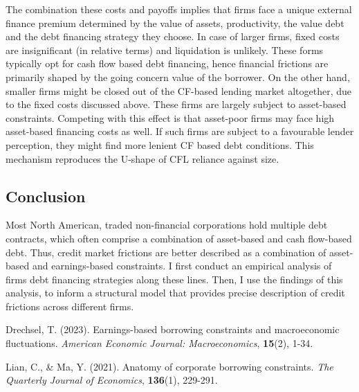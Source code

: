 \documentclass[12pt]{article}
\begin{document}
The combination these costs and payoffs implies that firms face a unique external finance premium determined by the value of assets, productivity, the value debt and the debt financing strategy they choose. In case of larger firms, fixed costs are insignificant (in relative terms) and liquidation is unlikely. These forms typically opt for cash flow based debt financing, hence financial frictions are primarily shaped by the going concern value of the borrower. On the other hand, smaller firms might be closed out of the CF-based lending market altogether, due to the fixed costs discussed above. These firms are largely subject to asset-based constraints. Competing with this effect is that asset-poor firms may face high asset-based financing costs as well. If such firms are subject to a favourable lender perception, they might find more lenient CF based debt conditions. This mechanism reproduces the U-shape of CFL reliance against size.  

\subsection*{Conclusion}

Most North American, traded non-financial corporations hold multiple debt contracts, which often comprise a combination of asset-based and cash flow-based debt. Thus, credit market frictions are better described as a combination of asset-based and earnings-based constraints. I first conduct an empirical analysis of firms debt financing strategies along these lines. Then, I use the findings of this analysis, to inform a structural model that provides precise description of credit frictions across different firms. 


\begin{thebibliography}{99}
 Drechsel, T. (2023). Earnings-based borrowing constraints and macroeconomic fluctuations. \textit{American Economic Journal: Macroeconomics}, \textbf{15}(2), 1-34.

 Lian, C., \& Ma, Y. (2021). Anatomy of corporate borrowing constraints. \textit{The Quarterly Journal of Economics}, \textbf{136}(1), 229-291.

\end{thebibliography}
\end{document}
